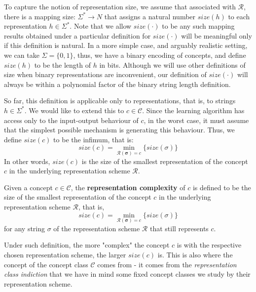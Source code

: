 To capture the notion of representation size, we assume that associated with $\bm{\mathcal{R}}$, there is a mapping size: $\Sigma^{*}\to N$ that assigns a natural number $size(h)$ to each representation $h\in \Sigma^{*}$. Note that we allow $size(\cdot)$ to be any such mapping results obtained under a particular definition for $size(\cdot)$ will be meaningful only if this definition is natural. In a more simple case, and arguably realistic setting, we can take $\Sigma=\{0,1\}$, thus, we have a binary encoding of concepts, and define $size(h)$ to be the length of $h$ in bits. Although we will use other definitions of size when binary representations are inconvenient, our definition of $size(\cdot)$ will always be within a polynomial factor of the binary string length definition.

So far, this definition is applicable only to representations, that is, to strings $h\in \Sigma^{*}$. We would like to extend this to $c\in \mathcal{C}$. Since the learning algorithm has access only to the input-output behaviour of $c$, in the worst case, it must assume that the simplest possible mechanism is generating this behaviour. Thus, we define $size(c)$ to be the infimum, that is: \begin{equation*}
    size(c) = \min_{\bm{\mathcal{R}(\sigma)}=c}\{size(\sigma)\}
\end{equation*}
In other words, $size(c)$ is the size of the smallest representation of the concept $c$ in the underlying representation scheme $\bm{\mathcal{R}}$. 
\begin{definition}
    Given a concept $c\in\mathcal{C}$, the \textbf{representation complexity} of $c$ is defined to be the size of the smallest representation of the concept $c$ in the underlying representation scheme $\bm{\mathcal{R}}$, that is, 
    \begin{equation*}
    size(c) = \min_{\bm{\mathcal{R}(\sigma)}=c}\{size(\sigma)\}
\end{equation*}
for any string $\sigma$ of the representation scheme $\bm{\mathcal{R}}$ that still represents $c$.
\end{definition}
Under such definition, the more "complex" the concept $c$ is with the respective chosen representation scheme, the larger $size(c)$ is. This is also where the concept of the concept class $\mathcal{C}$ comes from - it comes from the \textit{representation class indiction} that we have in mind some fixed concept classes we study by their representation scheme. 

